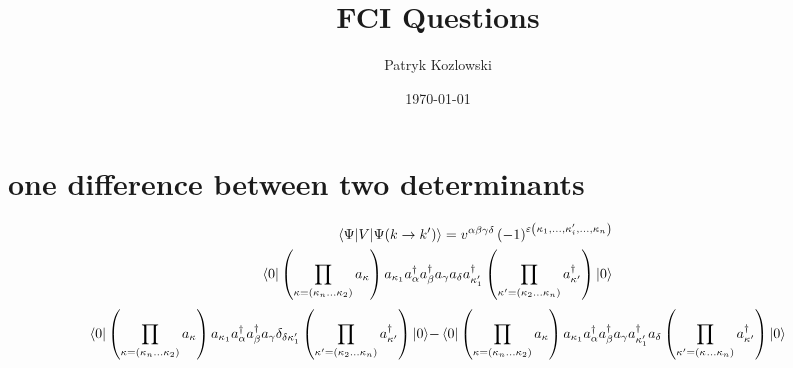\documentclass[12pt]{article}
\title{FCI Questions}
\author{Patryk Kozlowski}
\date{\today}
\begin{document}
\maketitle

\section{one difference between two determinants}
\begin{subequations}
    \begin{align}
        \mel{\Psi }{V}{\Psi (k\rightarrow k^{\prime})}
    =v^{\alpha\beta\gamma\delta}\left(-1\right)^{\varepsilon\left(\kappa_{1},\dots,\kappa_{i}^{\prime},\dots,\kappa_{n}\right)}\\
    \bra{0}\left(\prod_{\kappa=\left(\kappa_{n}\dots\kappa_{2}\right)}a_{\kappa}\right)
        a_{\kappa _{1}}a^{\dag}_{\alpha }a^{\dag}_{\beta }a_{\gamma }a_{\delta }a^{\dag}_{\kappa ^{\prime}_{1}}
    \left(\prod_{\kappa^{\prime}=\left(\kappa_{2}\dots\kappa_{n}\right)}a^{\dag}_{\kappa^{\prime}}\right)\ket{0}
    \end{align}
\end{subequations}
\begin{subequations}
    \begin{align}
        \bra{0}\left(\prod_{\kappa=\left(\kappa_{n}\dots\kappa_{2}\right)}a_{\kappa}\right)
            a_{\kappa _{1}}a^{\dag}_{\alpha }a^{\dag}_{\beta }a_{\gamma }\delta _{\delta  \kappa _{1}^{\prime}}
        \left(\prod_{\kappa^{\prime}=\left(\kappa_{2}\dots\kappa_{n}\right)}a^{\dag}_{\kappa^{\prime}}\right)\ket{0}
    \end{align}
    \begin{align}
        -\bra{0}\left(\prod_{\kappa=\left(\kappa_{n}\dots\kappa_{2}\right)}a_{\kappa}\right)
            a_{\kappa _{1}}a^{\dag}_{\alpha }a^{\dag}_{\beta }a_{\gamma }a^{\dag}_{\kappa _{1}^{\prime}}a_{\delta }
        \left(\prod_{\kappa^{\prime}=\left(\kappa_{}\dots\kappa_{n}\right)}a^{\dag}_{\kappa^{\prime}}\right)\ket{0}
    \end{align}
\end{subequations}
\end{document}
